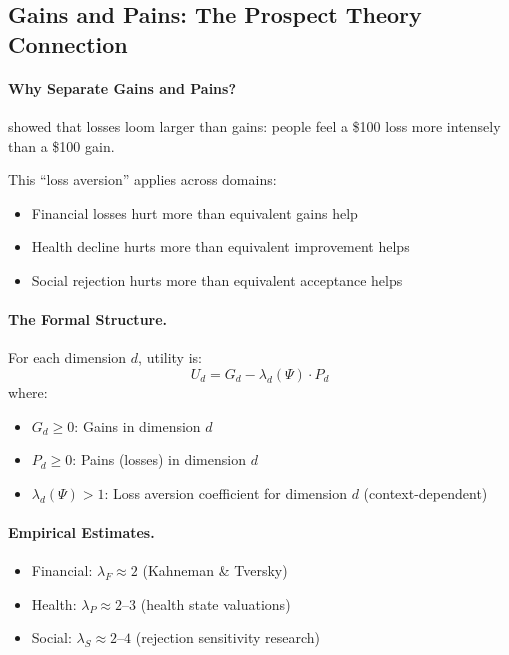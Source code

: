 \subsection{Gains and Pains: The Prospect Theory Connection}

\paragraph{Why Separate Gains and Pains?}
\citet{kahnemantversky1979} showed that losses loom larger than gains:
people feel a \$100 loss more intensely than a \$100 gain.

This ``loss aversion'' applies across domains:
\begin{itemize}
  \item Financial losses hurt more than equivalent gains help
  \item Health decline hurts more than equivalent improvement helps
  \item Social rejection hurts more than equivalent acceptance helps
\end{itemize}

\paragraph{The Formal Structure.}
For each dimension $d$, utility is:
\begin{equation}
  U_d = G_d - \lambda_d(\Psi) \cdot P_d
\end{equation}
where:
\begin{itemize}
  \item $G_d \geq 0$: Gains in dimension $d$
  \item $P_d \geq 0$: Pains (losses) in dimension $d$
  \item $\lambda_d(\Psi) > 1$: Loss aversion coefficient for dimension $d$ (context-dependent)
\end{itemize}

\paragraph{Empirical Estimates.}
\begin{itemize}
  \item Financial: $\lambda_F \approx 2$ (Kahneman \& Tversky)
  \item Health: $\lambda_P \approx 2$--$3$ (health state valuations)
  \item Social: $\lambda_S \approx 2$--$4$ (rejection sensitivity research)
\end{itemize}

